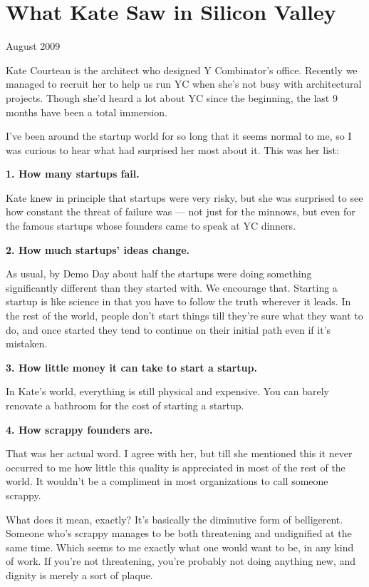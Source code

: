 \chapter{What Kate Saw in Silicon Valley  }

August 2009

Kate Courteau is the architect who designed Y Combinator's office.
Recently we managed to recruit her to help us run YC when she's not busy
with architectural projects. Though she'd heard a lot about YC since the
beginning, the last 9 months have been a total immersion.

I've been around the startup world for so long that it seems normal to
me, so I was curious to hear what had surprised her most about it. This
was her list:

\textbf{1. How many startups fail.}

Kate knew in principle that startups were very risky, but she was
surprised to see how constant the threat of failure was --- not just for
the minnows, but even for the famous startups whose founders came to
speak at YC dinners.

\textbf{2. How much startups' ideas change.}

As usual, by Demo Day about half the startups were doing something
significantly different than they started with. We encourage that.
Starting a startup is like science in that you have to follow the truth
wherever it leads. In the rest of the world, people don't start things
till they're sure what they want to do, and once started they tend to
continue on their initial path even if it's mistaken.

\textbf{3. How little money it can take to start a startup.}

In Kate's world, everything is still physical and expensive. You can
barely renovate a bathroom for the cost of starting a startup.

\textbf{4. How scrappy founders are.}

That was her actual word. I agree with her, but till she mentioned this
it never occurred to me how little this quality is appreciated in most
of the rest of the world. It wouldn't be a compliment in most
organizations to call someone scrappy.

What does it mean, exactly? It's basically the diminutive form of
belligerent. Someone who's scrappy manages to be both threatening and
undignified at the same time. Which seems to me exactly what one would
want to be, in any kind of work. If you're not threatening, you're
probably not doing anything new, and dignity is merely a sort of plaque.

